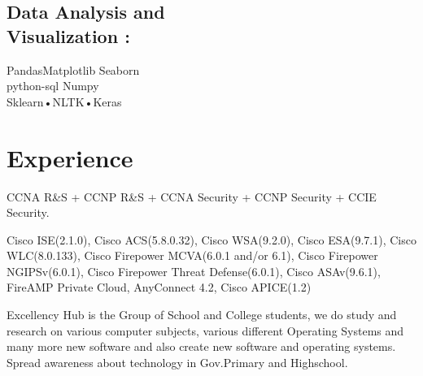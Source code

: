 \documentclass[]{deedy-resume-openfont}
\begin{document}
\begin{minipage}[t]{0.33\textwidth}
\subsection{Data Analysis and \\ Visualization :}

Pandas\textbullet{}Matplotlib \textbullet{} Seaborn \\
python-sql \textbullet{} Numpy \\
Sklearn•NLTK•Keras

\sectionsep

%
%

\end{minipage} 
\hfill
\begin{minipage}[t]{0.66\textwidth} 


\section{Experience}

\vspace{\topsep} %
\begin{tightemize}\item CCNA R&S + CCNP R&S + CCNA Security + CCNP Security + CCIE Security.\\
\end{tightemize}
\begin{tightemize}\item Cisco ISE(2.1.0), Cisco ACS(5.8.0.32), Cisco WSA(9.2.0), Cisco
ESA(9.7.1), Cisco WLC(8.0.133), Cisco Firepower MCVA(6.0.1 and/or 6.1), Cisco Firepower NGIPSv(6.0.1), Cisco
Firepower Threat Defense(6.0.1), Cisco ASAv(9.6.1), FireAMP Private Cloud,
AnyConnect 4.2, Cisco APICE(1.2) \\
\end{tightemize}


\begin{tightemize}
\item Excellency Hub is the Group of School and College students, we do study and research on various
computer subjects, various different Operating Systems and many more new software and also create new
software and operating systems. Spread awareness about technology in Gov.Primary and  Highschool. \end{tightemize}




\end{minipage}
\end{document}
